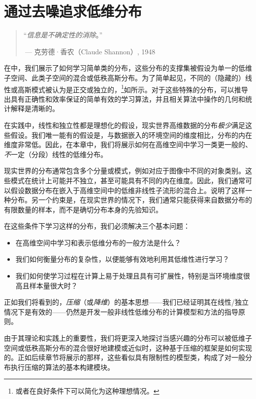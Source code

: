 \documentclass[../../book-main_zh.tex]{subfiles}
\begin{document}
\chapter{通过去噪追求低维分布}
\label{ch:denoising}

\begin{quote}
    \hfill  ``{\textit{信息是不确定性的消除}}。''

    \(~\)\hfill --- 克劳德·香农（Claude Shannon）, 1948
\end{quote}
\vspace{5mm}

在中，我们展示了如何学习简单类的分布，这些分布的支撑集被假设为单一的低维子空间、此类子空间的混合或低秩高斯分布。为了简单起见，不同的（隐藏的）线性或高斯模式被认为是正交或独立的，\footnote{或者在良好条件下可以简化为这种理想情况。}如所示。对于这些特殊的分布，可以推导出具有正确性和效率保证的简单有效的学习算法，并且相关算法中操作的几何和统计解释是清晰的。

在实践中，线性和独立性都是理想化的假设，现实世界高维数据的分布\textit{极少}满足这些假设。我们唯一能有的假设是，与数据嵌入的环境空间的维度相比，分布的内在维度非常低。因此，在本章中，我们将展示如何在高维空间中学习一类更一般的、\textit{不}一定（分段）线性的低维分布。

现实世界的分布通常包含多个分量或模式，例如对应于图像中不同的对象类别。这些模式在统计上可能并不独立，甚至可能具有不同的内在维度。因此，我们通常可以假设数据分布在嵌入于高维空间中的低维非线性子流形的混合上。说明了这样一种分布。另一个约束是，在现实世界的情况下，我们通常只能获得来自数据分布的有限数量的样本，而不是确切分布本身的先验知识。

在这些条件下学习这样的分布，我们必须解决三个基本问题：
\begin{itemize}
    \item 在高维空间中学习和表示低维分布的一般方法是什么？
    \item 我们如何衡量分布的复杂性，以便能够有效地利用其低维性进行学习？
    \item 我们如何使学习过程在计算上易于处理且具有可扩展性，特别是当环境维度很高且样本量很大时？
\end{itemize}
正如我们将看到的，\textit{压缩}（或\textit{降维}）的基本思想——我们已经证明其在线性/独立情况下是有效的——仍然是开发一般非线性低维分布的计算模型和方法的指导原则。

由于其理论和实践上的重要性，我们将更深入地探讨当感兴趣的分布可以被低维子空间或低秩高斯分布的混合很好地建模或近似时，这种基于压缩的框架是如何实现的。正如后续章节将展示的那样，这些看似具有限制性的模型类，构成了对一般分布执行压缩的算法的基本构建模块。
\end{document}
